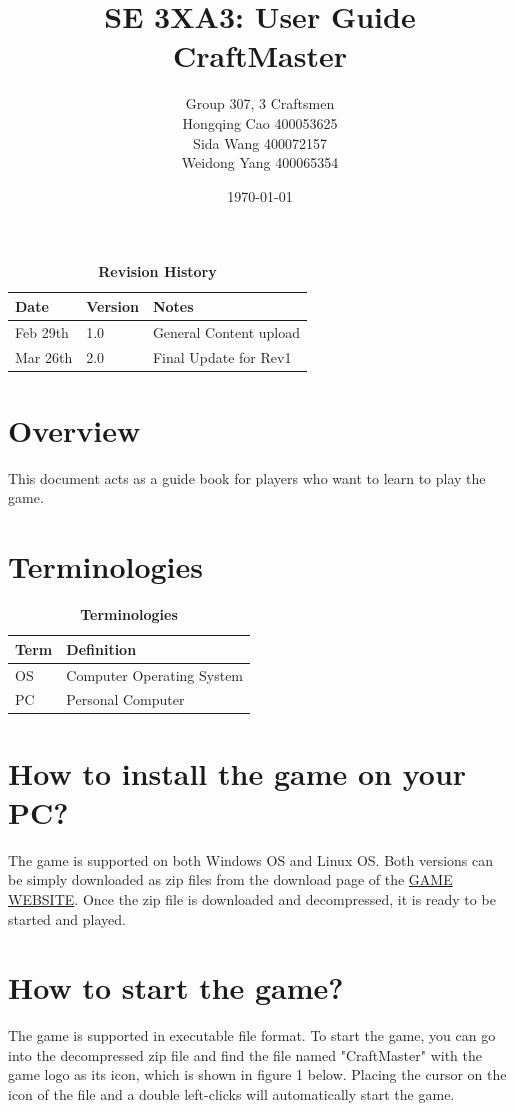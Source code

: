 \documentclass[12pt, titlepage]{article}
\title{SE 3XA3: User Guide\\CraftMaster}
\author{Group 307, 3 Craftsmen\\
		Hongqing Cao 400053625\\
		Sida Wang	 400072157\\
		Weidong Yang 400065354}
\date{\today}
\begin{document}
\maketitle

\tableofcontents
\listoftables
\listoffigures
\FloatBarrier
\begin{table}
\begin{tabularx}{\textwidth}{p{3cm}p{2cm}X}
\toprule {\bf Date} & {\bf Version} & {\bf Notes}\\
\midrule
Feb 29th & 1.0 & General Content upload\\
Mar 26th & 2.0 & Final Update for Rev1\\
\bottomrule
\end{tabularx}
\caption{\bf Revision History}
\end{table}
\FloatBarrier
\clearpage


\section{Overview}
This document acts as a guide book for players who want to learn to play the game.
\section{Terminologies}
\begin{table}[htbp]
\begin{tabularx}{\textwidth}{p{2cm}X}
\toprule {\bf Term} & {\bf Definition}\\
\midrule
OS & Computer Operating System\\
PC & Personal Computer\\
\bottomrule
\end{tabularx}
\caption{\bf Terminologies}
\end{table}
\section{How to install the game on your PC?}
The game is supported on both Windows OS and Linux OS. Both versions can be simply downloaded as zip files from the download page of the  \href{http://rexwangsida.pythonanywhere.com/}{GAME WEBSITE}. Once the zip file is downloaded and decompressed, it is ready to be started and played.
\section{How to start the game?}
The game is supported in executable file format. To start the game, you can go into the decompressed zip file and find the file named "CraftMaster" with the game logo as its icon, which is shown in figure 1 below. Placing the cursor on the icon of the file and a double left-clicks will automatically start the game.
 
\end{document}
